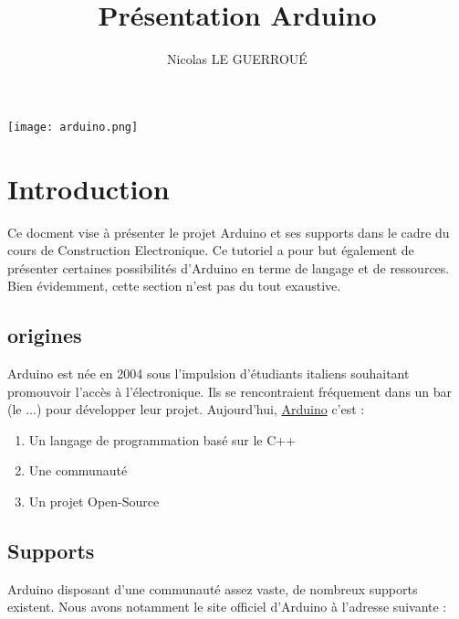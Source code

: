\documentclass[12pt]{report}
\begin{document}
\title{Présentation Arduino}

\author{Nicolas LE GUERROUÉ}  

\begin{center}
\texttt{[image: arduino.png]}
\end{center}

\maketitle
\tableofcontents


\chapter{Introduction}



Ce docment vise à présenter le projet Arduino et ses supports dans le cadre du cours de Construction Electronique. \newline
Ce tutoriel a pour but également de présenter certaines possibilités d'Arduino en terme de langage et de ressources. \newline
Bien évidemment, cette section n'est pas du tout exaustive.

\section{origines}

Arduino est née en 2004 sous l'impulsion d'étudiants italiens souhaitant promouvoir l'accès à  l'électronique. Ils se rencontraient fréquement dans un bar (le ...) pour développer leur projet. \newline
Aujourd'hui, \underline{Arduino} c'est :
\begin{enumerate}
\item Un langage de programmation basé sur le C++
\item Une communauté
\item Un projet Open-Source
\end{enumerate}

\section{Supports}

Arduino disposant d'une communauté assez vaste, de nombreux supports existent. \newline
Nous avons notamment le site officiel d'Arduino à l'adresse suivante :
\end{document}
